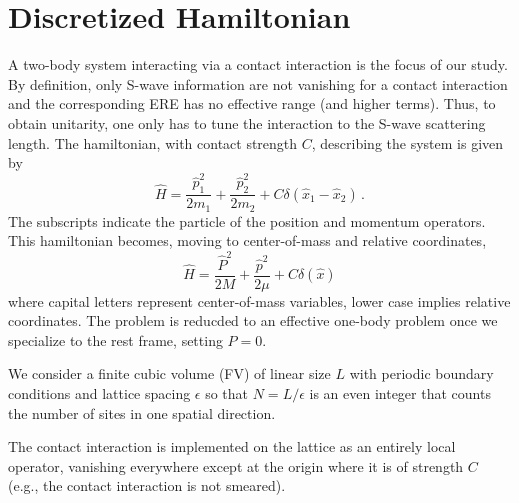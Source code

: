 \section{Discretized Hamiltonian}\label{sec:hamiltonian}

A two-body system interacting via a contact interaction is the focus of our study.
By definition, only S-wave information are not vanishing for a contact interaction and the corresponding ERE has no effective range (and higher terms).
Thus, to obtain unitarity, one only has to tune the interaction to the S-wave scattering length.
The hamiltonian, with contact strength $C$, describing the system is given by
\begin{equation}
    \label{eq:particle hamiltonian}
    \hat H = \frac{\hat p_1^2}{2 m_1} + \frac{\hat p_2^2}{2 m_2} + C \delta(\hat x_1 - \hat x_2)
    \, .
\end{equation}
The subscripts indicate the particle of the position and momentum operators.
This hamiltonian becomes, moving to center-of-mass and relative coordinates,
\begin{equation}
    \label{eq:hamiltonian}
    \hat H = \frac{\hat P^2}{2 M} + \frac{\hat p^2}{2 \mu} + C \delta(\hat x)
\end{equation}
where capital letters represent center-of-mass variables, lower case implies relative coordinates.
The problem is reducded to an effective one-body problem once we specialize to the rest frame, setting $P=0$.

We consider a finite cubic volume (FV) of linear size $L$ with periodic boundary conditions and lattice spacing $\epsilon$ so that $N=L/\epsilon$ is an even integer that counts the number of sites in one spatial direction.

The contact interaction is implemented on the lattice as an entirely local operator, vanishing everywhere except at the origin where it is of strength $C$ (e.g., the contact interaction is not smeared).


